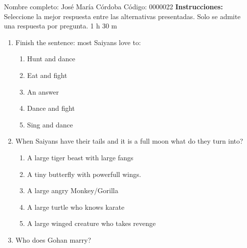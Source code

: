 \documentclass[letterpaper,addpoints,answers,twocolumn,10pt]{exam}
\begin{document}
\noindent Nombre completo: José María Córdoba
\newline \newline \newline \newline
Código: 0000022\newline \newline 
{\bf Instrucciones:} Seleccione la mejor respuesta entre las alternativas presentadas. Solo se admite una respuesta por pregunta.
 1 h 30 m

\begin{enumerate}[leftmargin=.2in]




\item  Finish the sentence: most Saiyans love to:


\begin{enumerate}[noitemsep,leftmargin=0in]


\item  Hunt and dance
\item  Eat and fight
\item  An answer
\item  Dance and fight
\item  Sing and dance


\end{enumerate}



\item  When Saiyans have their tails and it is a full moon what do they turn into?


\begin{enumerate}[noitemsep,leftmargin=0in]


\item  A large tiger beast with large fangs
\item  A tiny butterfly with powerfull wings.
\item  A large angry Monkey/Gorilla
\item  A large turtle who knows karate
\item  A large winged creature who takes revenge


\end{enumerate}



\item  Who does Gohan marry?


\begin{enumerate}[noitemsep,leftmargin=0in]



\end{enumerate}
\end{enumerate}
\end{document}
